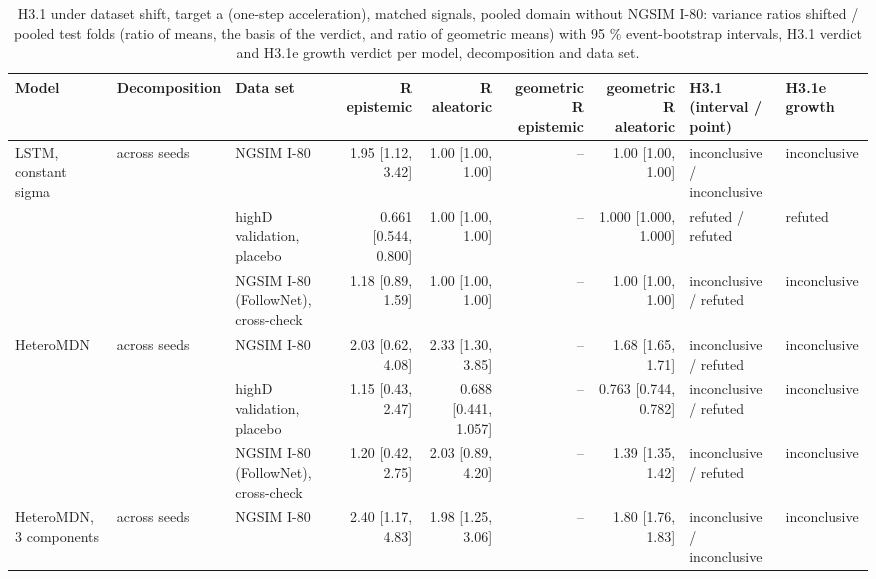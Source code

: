 \begin{table}[htbp]
\centering
\footnotesize
\caption{H3.1 under dataset shift, target a (one-step acceleration), matched signals, pooled domain without NGSIM I-80: variance ratios shifted / pooled test folds (ratio of means, the basis of the verdict, and ratio of geometric means) with 95 \% event-bootstrap intervals, H3.1 verdict and H3.1e growth verdict per model, decomposition and data set.}
\label{tab:t2-h31--lodo-ngsim--a}
\begin{tabular}{lllrrrrll}
\toprule
Model & Decomposition & Data set & R epistemic & R aleatoric & geometric R epistemic & geometric R aleatoric & H3.1 (interval / point) & H3.1e growth \\
\midrule
LSTM, constant sigma & across seeds & NGSIM I-80 & 1.95 [1.12, 3.42] & 1.00 [1.00, 1.00] & -- & 1.00 [1.00, 1.00] & inconclusive / inconclusive & inconclusive \\
 &  & highD validation, placebo & 0.661 [0.544, 0.800] & 1.00 [1.00, 1.00] & -- & 1.000 [1.000, 1.000] & refuted / refuted & refuted \\
 &  & NGSIM I-80 (FollowNet), cross-check & 1.18 [0.89, 1.59] & 1.00 [1.00, 1.00] & -- & 1.00 [1.00, 1.00] & inconclusive / refuted & inconclusive \\
\midrule
HeteroMDN & across seeds & NGSIM I-80 & 2.03 [0.62, 4.08] & 2.33 [1.30, 3.85] & -- & 1.68 [1.65, 1.71] & inconclusive / refuted & inconclusive \\
 &  & highD validation, placebo & 1.15 [0.43, 2.47] & 0.688 [0.441, 1.057] & -- & 0.763 [0.744, 0.782] & inconclusive / refuted & inconclusive \\
 &  & NGSIM I-80 (FollowNet), cross-check & 1.20 [0.42, 2.75] & 2.03 [0.89, 4.20] & -- & 1.39 [1.35, 1.42] & inconclusive / refuted & inconclusive \\
\midrule
HeteroMDN, 3 components & across seeds & NGSIM I-80 & 2.40 [1.17, 4.83] & 1.98 [1.25, 3.06] & -- & 1.80 [1.76, 1.83] & inconclusive / inconclusive & inconclusive \\

\end{tabular}
\end{table}
